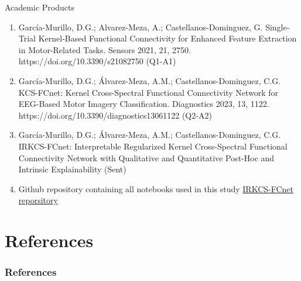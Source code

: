 \documentclass[aspectratio=169]{beamer}
\begin{document}
\begin{frame}{Academic Products}
    \begin{enumerate}
        \item García-Murillo, D.G.; Alvarez-Meza, A.; Castellanos-Dominguez, G. Single-Trial Kernel-Based Functional Connectivity for Enhanced Feature Extraction in Motor-Related Tasks. Sensors 2021, 21, 2750. https://doi.org/10.3390/s21082750 (Q1-A1)
    
        \item García-Murillo, D.G.; Álvarez-Meza, A.M.; Castellanos-Dominguez, C.G. KCS-FCnet: Kernel Cross-Spectral Functional Connectivity Network for EEG-Based Motor Imagery Classification. Diagnostics 2023, 13, 1122. https://doi.org/10.3390/diagnostics13061122 (Q2-A2)
    
        \item García-Murillo, D.G.; Álvarez-Meza, A.M.; Castellanos-Dominguez, C.G. IRKCS-FCnet: Interpretable Regularized Kernel Cross-Spectral Functional Connectivity Network with Qualitative and Quantitative Post-Hoc and Intrinsic Explainability (Sent)
    
        \item Github repository containing all notebooks used in this study  \href{https://github.com/dggarciam/PhD_code_reposotory}{IRKCS-FCnet reporsitory}
    \end{enumerate}
\end{frame}

\section{References}
\begin{frame}[allowframebreaks]%
\frametitle{References}
{\tiny 


}
\end{frame}
\end{document}
